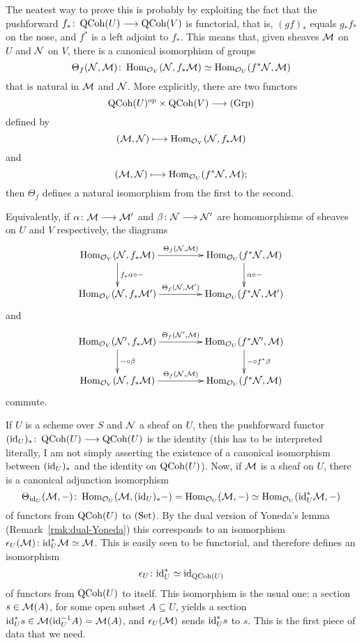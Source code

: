 \begin{3   FIBERED CATEGORIES}
\begin{3.2 Examples of fibered categories}
The neatest way to prove this is probably by exploiting the fact that the pushforward $f_* \colon \qcoh U \arr \qcoh V$ is functorial, that is, $(gf)_*$ equals $g_* f_*$ on the nose, and $f^*$ is a left adjoint to $f_*$. This means that, given \qc sheaves $\mathcal{M}$ on $U$ and $\mathcal{N}$ on $V$, there is a canonical isomorphism of groups
   \[
   \Theta_f(\mathcal{N},\mathcal{M})\colon
   \operatorname{Hom}_{\mathcal{O}_V}(\mathcal{N}, f_*\mathcal{M}) \simeq
   \operatorname{Hom}_{\mathcal{O}_U}(f^* \mathcal{N}, \mathcal{M})
   \]
that is natural in $\mathcal{M}$ and $\mathcal{N}$. More explicitly, there are two functors
   \[
   \qcoh U\op \times \qcoh V \arr \catgrp
   \]
defined by
   \[
   (\mathcal{M},\mathcal{N}) \longmapsto
   \operatorname{Hom}_{\mathcal{O}_V}(\mathcal{N}, f_*\mathcal{M})
   \]
and
   \[
   (\mathcal{M},\mathcal{N}) \longmapsto
   \operatorname{Hom}_{\mathcal{O}_U}(f^* \mathcal{N}, \mathcal{M});
   \]
then $\Theta_f$ defines a natural isomorphism from the first to
the second.

Equivalently, if $\alpha \colon \cM \arr \cM'$ and $\beta \colon \cN \arr \cN'$ are homomorphisms of \qc sheaves on $U$ and $V$ respectively, the diagrams
   \[
   \xymatrix@C+20pt{
   \hom_{\cO_V}(\cN, f_*\cM)
   \ar[d]^{f_* \alpha \circ -}
   \ar[r]^{\Theta_f(\cN,\cM)}  &
   \hom_{\cO_U}(f^* \cN, \cM)
   \ar[d]^{\alpha \circ -} \\
   \hom_{\cO_V}(\cN, f_*\cM')
   \ar[r]^{\Theta_f(\cN,\cM')} &
   \hom_{\cO_U}(f^* \cN, \cM')
   }
   \]
and
   \[
   \xymatrix@C+20pt{
   \hom_{\cO_V}(\cN', f_*\cM)
   \ar[r]^{\Theta_f(\cN',\cM)} \ar[d]^{- \circ \beta} &
   \hom_{\cO_U}(f^* \cN', \cM)
   \ar[d]^{- \circ f^*\beta}  \\
   \hom_{\cO_V}(\cN, f_*\cM)
   \ar[r]^{\Theta_f(\cN,\cM)} &
   \hom_{\cO_U}(f^{*}\cN, \cM)
   }
   \]
commute.

If $U$ is a scheme over $S$ and $\mathcal{N}$  a \qc sheaf on $U$, then the pushforward functor $(\id_U)_* \colon \qcoh U \arr \qcoh U$ is the identity (this has to be interpreted literally, I am not simply asserting the existence of a canonical isomorphism between $(\mathrm{id}_U)_*$ and the identity on $\operatorname{QCoh}(U)$). Now, if $\mathcal{M}$ is a \qc sheaf on $U$, there is a canonical adjunction isomorphism
   \[
   \Theta_{\mathrm{id}_U}(\mathcal{M}, -) \colon
   \operatorname{Hom}_{\mathcal{O}_U}(\mathcal{M}, (\mathrm{id}_U)_*-) = 
   \operatorname{Hom}_{\mathcal{O}_U}(\mathcal{M}, -) \simeq
   \operatorname{Hom}_{\mathcal{O}_U}(\mathrm{id}_U^*\mathcal{M}, -)
   \]
of functors from $\operatorname{QCoh}(U)$ to $(\mathrm{Set})$. By the dual version of Yoneda's lemma (Remark~\ref{rmk:dual-Yoneda}) this corresponds to an isomorphism $\epsilon_U (\mathcal{M}) \colon \mathrm{id}_U^*\mathcal{M} \simeq \mathcal{M}$. This is easily seen to be functorial, and therefore defines an isomorphism
   \[
   \epsilon_U \colon \mathrm{id}_U^* \simeq \mathrm{id}_{\operatorname{QCoh}(U)}   
   \]
of functors from $\operatorname{QCoh}(U)$ to itself. This isomorphism is the usual one: a section $s \in \mathcal{M}(A)$, for some open subset $A \subseteq U$, yields a section $\mathrm{id}_U^* s \in \mathcal{M}(\mathrm{id}_U ^{-1} A) = \mathcal{M}(A)$, and $\epsilon_U(\mathcal{M})$ sends $\mathrm{id}_U^* s$ to $s$. This is the first piece of data that we need.


\end{3.2 Examples of fibered categories}
\end{3   FIBERED CATEGORIES}
